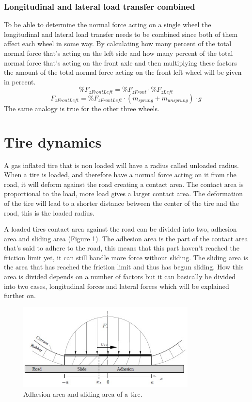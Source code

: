 \subsubsection{Longitudinal and lateral load transfer combined}
To be able to determine the normal force acting on a single wheel the longitudinal and lateral load transfer needs to be combined since both of them affect each wheel in some way. By calculating how many percent of the total normal force that's acting on the left side and how many percent of the total normal force that's acting on the front axle and then multiplying these factors the amount of the total normal force acting on the front left wheel will be given in percent.
\begin{equation} \label{eq:normal_percent}
	\%F_{zFrontLeft} = \%F_{zFront}\cdot \%F_{zLeft}
\end{equation}
\begin{equation} \label{eq:normal_percent_final}
	F_{zFrontLeft} = \%F_{zFrontLeft}\cdot (m_{sprung}+m_{unsprung})\cdot g
\end{equation}
The same analogy is true for the other three wheels.
	 
\section{Tire dynamics}
A gas inflated tire that is non loaded will have a radius called unloaded radius. When a tire is loaded, and therefore have a normal force acting on it from the road, it will deform against the road creating a contact area. The contact area is proportional to the load, more load gives a larger contact area. The deformation of the tire will lead to a shorter distance between the center of the tire and the road, this is the loaded radius. 

A loaded tires contact area against the road can be divided into two, adhesion area and sliding area (Figure \ref{adh_sliding}). The adhesion area is the part of the contact area that's said to adhere to the road, this means that this part haven't reached the friction limit yet, it can still handle more force without sliding. The sliding area is the area that has reached the friction limit and thus has begun sliding. How this area is divided depends on a number of factors but it can basically be divided into two cases, longitudinal forces and lateral forces which will be explained further on.
\begin{figure}[h]
	\centering
	\includegraphics[width=0.8\textwidth]{Pictures/adh_sliding}
	\caption{Adhesion area and sliding area of a tire. \cite{svendenius2013}}
	\label{adh_sliding}
\end{figure}

